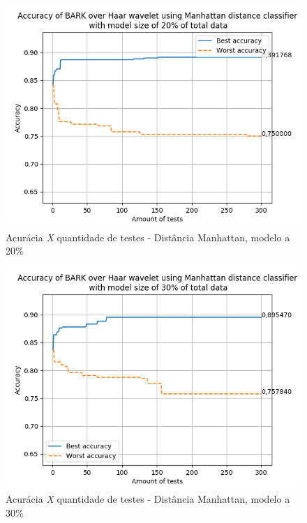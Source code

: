\begin{myenv}{1.5}
			\newpage
			\begin{figure}[h]
				\centering
				\includegraphics{images/results/confusionMatrices/classifier_Manhattan_20.png}
				\caption{Acurácia \textit{X} quantidade de testes - Distância Manhattan, modelo a 20\%}
				\label{fig:classifiermanhattan20}
			\end{figure}
			
	
			\newpage
			\begin{figure}[h]
				\centering
				\includegraphics{images/results/confusionMatrices/classifier_Manhattan_30.png}
				\caption{Acurácia \textit{X} quantidade de testes - Distância Manhattan, modelo a 30\%}
				\label{fig:classifiermanhattan30}
			\end{figure}
			
			

\end{myenv}
